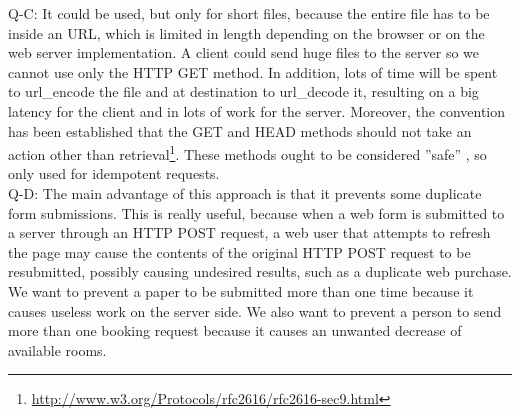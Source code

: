 Q-C: It could be used, but only for short files, because the entire file has to be inside an URL, which is limited in length depending on the browser or on the web server implementation. A client could send huge files to the server so we cannot use only the HTTP GET method. In addition, lots of time will be spent to url\_encode the file and at destination to url\_decode it, resulting on a big latency for the client and in lots of work for the server. Moreover, the convention has been established that the GET and HEAD methods should not take an action other than retrieval\footnote{\url{http://www.w3.org/Protocols/rfc2616/rfc2616-sec9.html}}. These methods ought to be considered ''safe'' , so only used for idempotent requests.\\

Q-D: The main advantage of this approach is that it prevents some duplicate form submissions. This is really useful, because when a web form is submitted to a server through an HTTP POST request, a web user that attempts to refresh the page may cause the contents of the original HTTP POST request to be resubmitted, possibly causing undesired results, such as a duplicate web purchase. We want to prevent a paper to be submitted more than one time because it causes useless work on the server side. We also want to prevent a person to send more than one booking request because it causes an unwanted decrease of available rooms.\\


